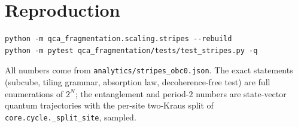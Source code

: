 \documentclass[11pt]{article}
\newcommand{\fn}[1]{\texttt{#1}}
\theoremstyle{plain}
\begin{document}
\section{Reproduction}

\begin{verbatim}
python -m qca_fragmentation.scaling.stripes --rebuild
python -m pytest qca_fragmentation/tests/test_stripes.py -q
\end{verbatim}

\noindent All numbers come from \fn{analytics/stripes\_obc0.json}. The exact
statements (subcube, tiling grammar, absorption law, decoherence-free test) are
full enumerations of $2^N$; the entanglement and period-$2$ numbers are
state-vector quantum trajectories with the per-site two-Kraus split of
\fn{core.cycle.\_split\_site}, sampled.
\end{document}
